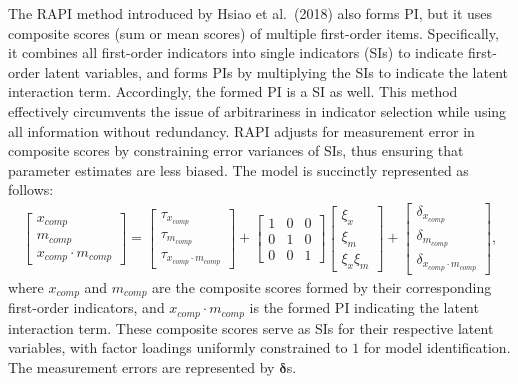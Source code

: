 \documentclass[
  man]{apa6}
\begin{document}
The RAPI method introduced by Hsiao et al.~(2018) also forms PI, but it uses composite scores (sum or mean scores) of multiple first-order items. Specifically, it combines all first-order indicators into single indicators (SIs) to indicate first-order latent variables, and forms PIs by multiplying the SIs to indicate the latent interaction term. Accordingly, the formed PI is a SI as well. This method effectively circumvents the issue of arbitrariness in indicator selection while using all information without redundancy. RAPI adjusts for measurement error in composite scores by constraining error variances of SIs, thus ensuring that parameter estimates are less biased. The model is succinctly represented as follows:
\begin{align}
    \begin{bmatrix}
        x_{comp} \\
        m_{comp} \\
        x_{comp} \cdot m_{comp}
    \end{bmatrix} = 
    \begin{bmatrix}
        \tau_{x_{comp}} \\
        \tau_{m_{comp}} \\ 
        \tau_{x_{comp} \cdot m_{comp}} 
    \end{bmatrix} + 
    \begin{bmatrix}
        1 & 0 & 0 \\
        0 & 1 & 0 \\ 
        0 & 0 & 1 
    \end{bmatrix}
    \begin{bmatrix}
        \xi_{x} \\  
        \xi_{m} \\ 
        \xi_{x}\xi_{m}
    \end{bmatrix} +
    \begin{bmatrix}
        \delta_{x_{comp}} \\
        \delta_{m_{comp}} \\ 
        \delta_{x_{comp} \cdot m_{comp}}
    \end{bmatrix},
\end{align}
where \(x_{comp}\) and \(m_{comp}\) are the composite scores formed by their corresponding first-order indicators, and \(x_{comp} \cdot m_{comp}\) is the formed PI indicating the latent interaction term. These composite scores serve as SIs for their respective latent variables, with factor loadings uniformly constrained to \(1\) for model identification. The measurement errors are represented by \(\mathbf{\delta}\)s.
\end{document}
